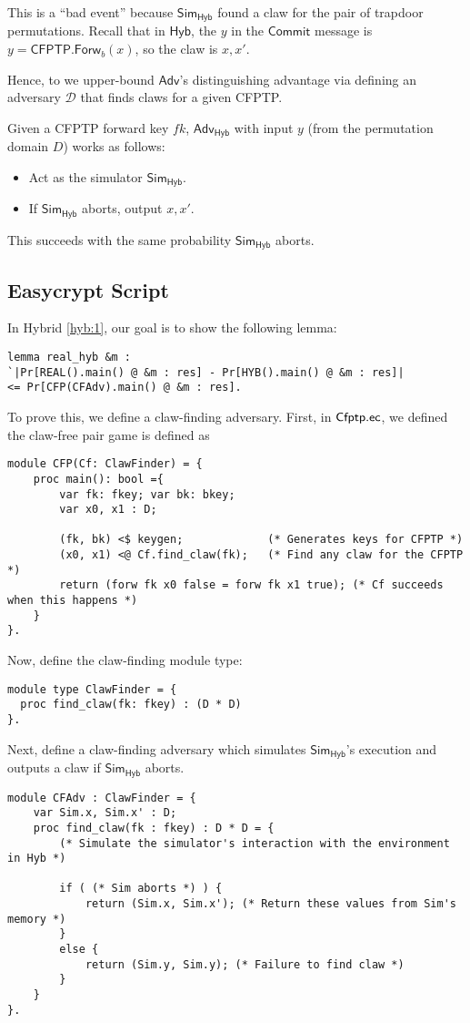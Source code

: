 \documentclass{article}[11pt]
\newcommand{\Sim}{{\mathsf{Sim}}} %
\newcommand{\Adversary}{{\mathsf{Adv}}} %
\newcommand{\CFPTPAdversary}{{\mathcal{D}}}
\newcommand{\Hyb}{{\mathsf{Hyb}}}
\newcommand{\CommitMsg}{\mathsf{Commit}}
\newcommand{\CFPTP}{\mathsf{CFPTP}}
\newcommand{\Forw}{\mathsf{Forw}}
\newcommand{\ForwKey}{fk}
\newcommand{\Domain}{D}
\begin{document}
This is a ``bad event'' because $\Sim_\Hyb$ found a claw for the pair of trapdoor permutations. Recall that in $\Hyb$, the $y$ in the $\CommitMsg$ message is $y = \CFPTP.\Forw_{b}(x)$, so the claw is $x, x'$.

Hence, to we upper-bound $\Adversary$'s distinguishing advantage via defining an adversary $\CFPTPAdversary$ that finds claws for a given CFPTP.

Given a CFPTP forward key $\ForwKey$, $\Adversary_{\Hyb}$ with input $y$ (from the permutation domain $\Domain$) works as follows:
\begin{itemize}
	\item Act as the simulator $\Sim_\Hyb$.
	\item If $\Sim_\Hyb$ aborts, output $x, x'$.
\end{itemize}
This succeeds with the same probability $\Sim_\Hyb$ aborts.

\subsection{Easycrypt Script}

In Hybrid \ref{hyb:1}, our goal is to show the following lemma:
\begin{lstlisting}
lemma real_hyb &m :
`|Pr[REAL().main() @ &m : res] - Pr[HYB().main() @ &m : res]|
<= Pr[CFP(CFAdv).main() @ &m : res].
\end{lstlisting}

To prove this, we define a claw-finding adversary. First, in ${\sf Cfptp.ec}$, we defined the claw-free pair game is defined as
\begin{lstlisting}
module CFP(Cf: ClawFinder) = {
	proc main(): bool ={
		var fk: fkey; var bk: bkey;
    	var x0, x1 : D;

    	(fk, bk) <$ keygen;             (* Generates keys for CFPTP *)
    	(x0, x1) <@ Cf.find_claw(fk);   (* Find any claw for the CFPTP *)
    	return (forw fk x0 false = forw fk x1 true); (* Cf succeeds when this happens *)
  	}
}.
\end{lstlisting}

Now, define the claw-finding module type:
\begin{lstlisting}
module type ClawFinder = {
  proc find_claw(fk: fkey) : (D * D)
}.
\end{lstlisting}

Next, define a claw-finding adversary which simulates $\Sim_\Hyb$'s execution and outputs a claw if $\Sim_\Hyb$ aborts.
\begin{lstlisting}
module CFAdv : ClawFinder = {
	var Sim.x, Sim.x' : D;
	proc find_claw(fk : fkey) : D * D = {
		(* Simulate the simulator's interaction with the environment in Hyb *)

		if ( (* Sim aborts *) ) {
			return (Sim.x, Sim.x'); (* Return these values from Sim's memory *)
		}
		else {
			return (Sim.y, Sim.y); (* Failure to find claw *)
		}
	}
}.
\end{lstlisting}

{\small{


}}
\end{document}
